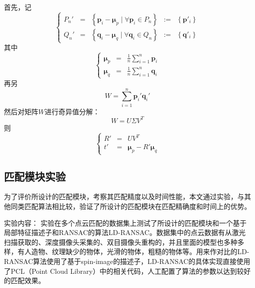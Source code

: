 首先，记
\begin{equation}
  \left\{
  \begin{array}{ccccc}
  P_n'& = &\left\{\mathbf{p}_i-\mathbf{\mu}_p \;|\; \forall \mathbf{p}_i \in P_n\right\}&:=&\left\{\mathbf{p}'_i\right\}\\
  Q_n'& = &\left\{\mathbf{q}_i-\mathbf{\mu}_q \;|\; \forall \mathbf{q}_i \in Q_n\right\}&:=&\left\{\mathbf{q}'_i\right\}
  \end{array}
  \right.
\end{equation}
其中
\begin{equation}
  \left\{
    \begin{array}{ccc}
      \mathbf{\mu}_p&=&\frac{1}{n}\sum_{i=1}^n{\mathbf{p}_i}\\
      \mathbf{\mu}_q&=&\frac{1}{n}\sum_{i=1}^n{\mathbf{q}_i}
    \end{array}
  \right.
\end{equation}
再另
\begin{equation}
  W = \sum_{i=1}^n{\mathbf{p}_i'\mathbf{q}_i'}
\end{equation}
然后对矩阵$W$进行奇异值分解：
\begin{equation}
  W = U\Sigma V^T
\end{equation}
则
\begin{equation}
  \left\{
    \begin{array}{ccc}
      R'&=&UV^T \\
        t'&=&\mathbf{\mu}_p-R'\mathbf{\mu}_q
    \end{array}
    \right.
\end{equation}

\subsection{匹配模块实验}
\label{sec:matcher_exp}
为了评价所设计的匹配模块，考察其匹配精度以及时间性能，本文通过实验，与其他同类匹配算法相比较，验证了所设计的匹配模块在匹配精确度和时间上的优势。

{\kai 实验内容}：
实验在多个点云匹配的数据集上测试了所设计的匹配模块和一个基于局部特征描述子和RANSAC的算法LD-RANSAC\cite{li2005multiscale}。数据集中的点云数据有从激光扫描获取的、深度摄像头采集的、双目摄像头重构的，并且里面的模型也多种多样，有人造物、纹理缺少的物体，光滑的物体，粗糙的物体等。用来作对比的LD-RANSAC算法使用了基于spin-image的描述子\cite{johnson1999using}，LD-RANSAC的具体实现直接使用了PCL（Point Cloud Library）中的相关代码，人工配置了算法的参数以达到较好的匹配效果。

